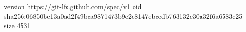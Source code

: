 version https://git-lfs.github.com/spec/v1
oid sha256:06850bc13a0ad2f49bea9871473b9e2e8147ebeedb763132c30a32f6a6583c25
size 4531
